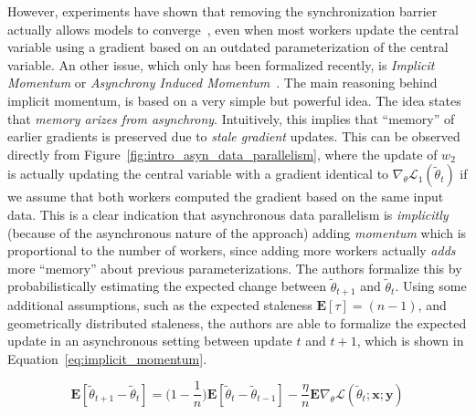 However, experiments have shown that removing the synchronization barrier actually allows models to converge~\cite{dean2012large, zhang2015deep, hadjis2016omnivore}, even when most workers update the central variable using a gradient based on an outdated parameterization of the central variable. An other issue, which only has been formalized recently, is \emph{Implicit Momentum} or \emph{Asynchrony Induced Momentum}~\cite{implicitmomentum}. The main reasoning behind implicit momentum, is based on a very simple but powerful idea. The idea states that \emph{memory arizes from asynchrony}. Intuitively, this implies that ``memory'' of earlier gradients is preserved due to \emph{stale gradient} updates. This can be observed directly from Figure~\ref{fig:intro_asyn_data_parallelism}, where the update of $w_2$ is actually updating the central variable with a gradient identical to $\nabla_\theta \mathcal{L}_1(\tilde{\theta}_t)$ if we assume that both workers computed the gradient based on the same input data. This is a clear indication that asynchronous data parallelism is \emph{implicitly} (because of the asynchronous nature of the approach) adding \emph{momentum} which is proportional to the number of workers, since adding more workers actually \emph{adds} more ``memory'' about previous parameterizations. The authors formalize this by probabilistically estimating the expected change between $\tilde{\theta}_{t+1}$ and $\tilde{\theta}_t$. Using some additional assumptions, such as the expected staleness $\mathbf{E}[\tau] = (n - 1)$, and geometrically distributed staleness, the authors are able to formalize the expected update in an asynchronous setting between update $t$ and $t + 1$, which is shown in Equation~\ref{eq:implicit_momentum}.

\begin{equation}
  \label{eq:implicit_momentum}
  \mathbf{E}[\tilde{\theta}_{t+1} - \tilde{\theta}_t] = \Bigg( 1 - \frac{1}{n} \Bigg) \mathbf{E}[\tilde{\theta}_t - \tilde{\theta}_{t-1}] - \frac{\eta}{n} \mathbf{E} \nabla_\theta \mathcal{L}(\tilde{\theta}_t;\textbf{x};\textbf{y})
\end{equation}


